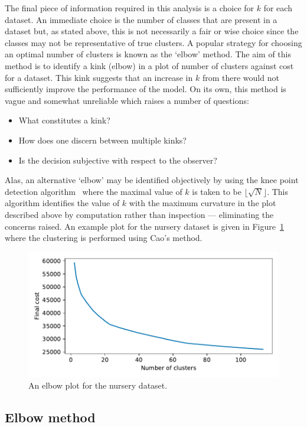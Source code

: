 The final piece of information required in this analysis is a choice for \(k\)
for each dataset. An immediate choice is the number of classes that are present
in a dataset but, as stated above, this is not necessarily a fair or wise choice
since the classes may not be representative of true clusters. A popular strategy
for choosing an optimal number of clusters is known as the `elbow' method. The
aim of this method is to identify a kink (elbow) in a plot of number of clusters
against cost for a dataset. This kink suggests that an increase in \(k\) from
there would not sufficiently improve the performance of the model. On its own,
this method is vague and somewhat unreliable which raises a number of questions:
\begin{itemize}
    \item What constitutes a kink?
    \item How does one discern between multiple kinks?
    \item Is the decision subjective with respect to the observer?
\end{itemize}

Alas, an alternative `elbow' may be identified objectively by using
the knee point detection algorithm~\cite{Satopaa2011} where the maximal
value of \(k\) is taken to be \(\lfloor\sqrt{N}\rfloor\). This algorithm
identifies the value of \(k\) with the maximum curvature in the plot described
above by computation rather than inspection --- eliminating the concerns raised.
An example plot for the nursery dataset is given in
Figure~\ref{fig:nursery_costs} where the clustering is performed using Cao's
method.

\begin{figure}
    \centering
    \includegraphics[width=.6\linewidth]{./img/elbow/nursery_costs.pdf}
    \caption{An elbow plot for the nursery dataset.}\label{fig:nursery_costs}
\end{figure}

\subsection{Elbow method}

